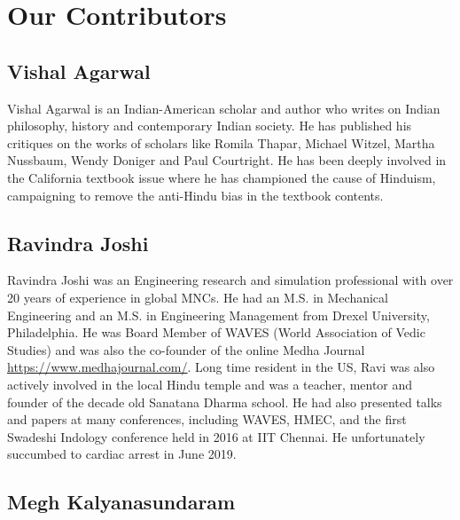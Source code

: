 
\chapter*{Our Contributors }\label{contributors}

\section*{Vishal Agarwal}

Vishal Agarwal is an Indian-American scholar and author who writes on Indian philosophy, history and contemporary Indian society. He has published his critiques on the works of scholars like Romila Thapar, Michael Witzel, Martha Nussbaum, Wendy Doniger and Paul Courtright. He has been deeply involved in the California textbook issue where he has championed the cause of Hinduism, campaigning to remove the anti-Hindu bias in the textbook contents.


\section*{Ravindra Joshi}

Ravindra Joshi was an Engineering research and simulation professional with over 20 years of experience in global MNCs. He had an M.S. in Mechanical Engineering and an M.S. in Engineering Management from Drexel University, Philadelphia. He was Board Member of WAVES (World Association of Vedic Studies) and was also the co-founder of the online Medha Journal \url{https://www.medhajournal.com/}. Long time resident in the US, Ravi was also actively involved in the local Hindu temple and was a teacher, mentor and founder of the decade old Sanatana Dharma school. He had also presented talks and papers at many conferences, including WAVES, HMEC, and the first Swadeshi Indology conference held in 2016 at IIT Chennai. He unfortunately succumbed to cardiac arrest in June 2019.

\newpage

\section*{Megh Kalyanasundaram}

